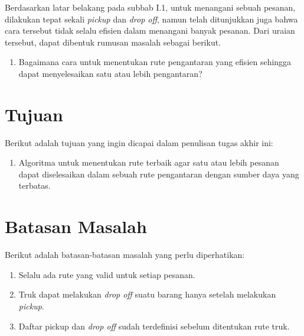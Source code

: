 Berdasarkan latar belakang pada subbab I.1, untuk menangani sebuah pesanan, dilakukan tepat 
sekali \textit{pickup} dan \textit{drop off}, namun telah ditunjukkan juga bahwa cara tersebut 
tidak selalu efisien dalam menangani banyak pesanan. 
Dari uraian tersebut, dapat dibentuk rumusan masalah sebagai berikut.

\begin{enumerate}
  \item Bagaimana cara untuk menentukan rute pengantaran yang efisien sehingga dapat menyelesaikan satu atau lebih pengantaran?
\end{enumerate}

\section{Tujuan}

Berikut adalah tujuan yang ingin dicapai dalam penulisan tugas akhir ini:

\begin{enumerate}
  \item Algoritma untuk menentukan rute terbaik agar satu atau lebih pesanan dapat diselesaikan dalam sebuah rute pengantaran dengan sumber daya yang terbatas.
\end{enumerate}

\section{Batasan Masalah}

Berikut adalah batasan-batasan masalah yang perlu diperhatikan:

\begin{enumerate}
  \item Selalu ada rute yang valid untuk setiap pesanan.
  \item Truk dapat melakukan \textit{drop off} suatu barang hanya setelah melakukan \textit{pickup}.
  \item Daftar pickup dan \textit{drop off} sudah terdefinisi sebelum ditentukan rute truk.
\end{enumerate}


